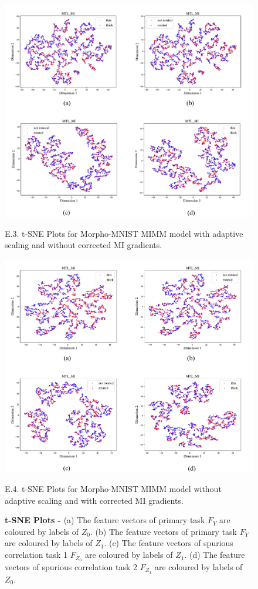 \documentclass[12pt,DIV14,BCOR12mm,a4paper,footinclude=false,headinclude,parskip=half-,twoside,openright,cleardoublepage=empty,toc=index,bibliography=totoc,listof=totoc]{scrreprt}
\numberwithin{equation}{chapter}
\begin{document}
\begin{figure}[H]
\centering
\includegraphics[width=0.7\linewidth]{thesis/figures/tsne_mmnist_ada_nocorr.pdf}
\caption{E.3. t-SNE Plots for Morpho-MNIST MIMM model with adaptive scaling and without corrected MI gradients.}
\includegraphics[width=0.7\linewidth]
{thesis/figures/tsne_mmnist_noada_corr.pdf}
\caption{E.4. t-SNE Plots for Morpho-MNIST MIMM model without adaptive scaling and with corrected MI gradients.}

\caption*{\textbf{t-SNE Plots - }(a) The feature vectors of primary task $F_Y$ are coloured by labels of $Z_0$. (b) The feature vectors of primary task $F_Y$ are coloured by labels of $Z_1$. (c) The feature vectors of spurious correlation task 1 $F_{Z_0}$ are coloured by labels of $Z_1$. (d) The feature vectors of spurious correlation task 2 $F_{Z_1}$ are coloured by labels of $Z_0$.}
\end{figure}
\end{document}
